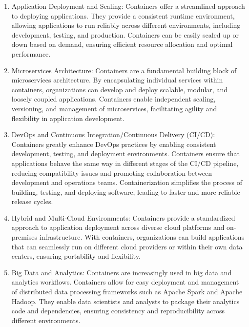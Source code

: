 \begin{enumerate}
    \item Application Deployment and Scaling: Containers offer a streamlined approach to deploying applications. They provide a consistent runtime environment, allowing applications to run reliably across different environments, including development, testing, and production. Containers can be easily scaled up or down based on demand, ensuring efficient resource allocation and optimal performance.
    
    \item Microservices Architecture: Containers are a fundamental building block of microservices architecture. By encapsulating individual services within containers, organizations can develop and deploy scalable, modular, and loosely coupled applications. Containers enable independent scaling, versioning, and management of microservices, facilitating agility and flexibility in application development.



    \item DevOps and Continuous Integration/Continuous Delivery (CI/CD): Containers greatly enhance DevOps practices by enabling consistent development, testing, and deployment environments. Containers ensure that applications behave the same way in different stages of the CI/CD pipeline, reducing compatibility issues and promoting collaboration between development and operations teams. Containerization simplifies the process of building, testing, and deploying software, leading to faster and more reliable release cycles.

    \item Hybrid and Multi-Cloud Environments: Containers provide a standardized approach to application deployment across diverse cloud platforms and on-premises infrastructure. With containers, organizations can build applications that can seamlessly run on different cloud providers or within their own data centers, ensuring portability and flexibility.

    \item Big Data and Analytics: Containers are increasingly used in big data and analytics workflows. Containers allow for easy deployment and management of distributed data processing frameworks such as Apache Spark and Apache Hadoop. They enable data scientists and analysts to package their analytics code and dependencies, ensuring consistency and reproducibility across different environments.


\end{enumerate}
